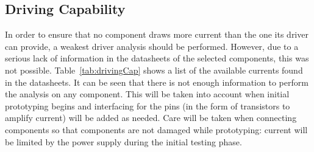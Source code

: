 \subsection{Driving Capability}

In order to ensure that no component draws more current than the one its driver can provide, a weakest driver analysis should be performed.  However, due to a serious lack of information in the datasheets of the selected components, this was not possible.  Table~\ref{tab:drivingCap} shows a list of the available currents found in the datasheets.  It can be seen that there is not enough information to perform the analysis on any component.  This will be taken into account when initial prototyping begins and interfacing for the pins (in the form of transistors to amplify current) will be added as needed.  Care will be taken when connecting components so that components are not damaged while prototyping: current will be limited by the power supply during the initial testing phase.


